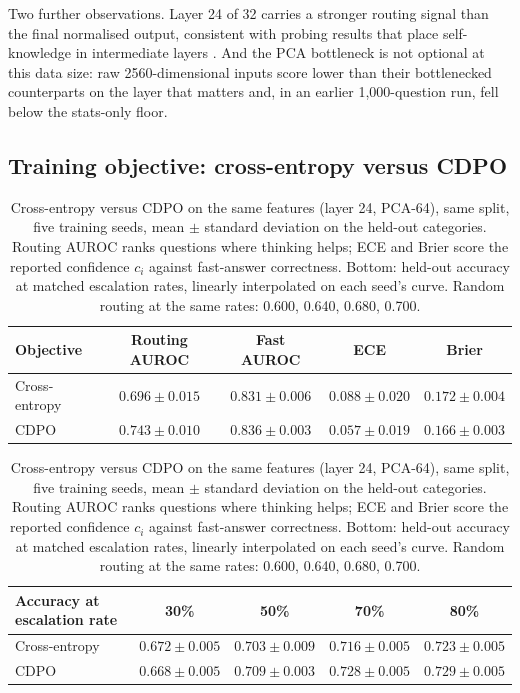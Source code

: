 \documentclass{article}
\newcommand{\cdpo}{CDPO}
\begin{document}
Two further observations. Layer 24 of 32 carries a stronger routing signal than the final normalised output, consistent with probing results that place self-knowledge in intermediate layers \citep{azaria2023internal}. And the PCA bottleneck is not optional at this data size: raw 2560-dimensional inputs score lower than their bottlenecked counterparts on the layer that matters and, in an earlier 1{,}000-question run, fell below the stats-only floor.

\subsection{Training objective: cross-entropy versus \cdpo{}}
\label{sec:objective}

\begin{table}[t]
\caption{Cross-entropy versus \cdpo{} on the same features (layer 24, PCA-64), same split, five training seeds, mean $\pm$ standard deviation on the held-out categories. Routing AUROC ranks questions where thinking helps; ECE and Brier score the reported confidence $c_i$ against fast-answer correctness. Bottom: held-out accuracy at matched escalation rates, linearly interpolated on each seed's curve. Random routing at the same rates: 0.600, 0.640, 0.680, 0.700.}
\label{tab:objective}
\centering
\small
\setlength{\tabcolsep}{4pt}
\begin{tabular}{lcccc}
\toprule
Objective & Routing AUROC & Fast AUROC & ECE & Brier \\
\midrule
Cross-entropy & $0.696\pm0.015$ & $0.831\pm0.006$ & $0.088\pm0.020$ & $0.172\pm0.004$ \\
\cdpo{} & $\mathbf{0.743\pm0.010}$ & $0.836\pm0.003$ & $\mathbf{0.057\pm0.019}$ & $\mathbf{0.166\pm0.003}$ \\
\bottomrule
\end{tabular}
\vspace{4pt}

\begin{tabular}{lcccc}
\toprule
Accuracy at escalation rate & 30\% & 50\% & 70\% & 80\% \\
\midrule
Cross-entropy & $0.672\pm0.005$ & $0.703\pm0.009$ & $0.716\pm0.005$ & $0.723\pm0.005$ \\
\cdpo{} & $0.668\pm0.005$ & $\mathbf{0.709\pm0.003}$ & $\mathbf{0.728\pm0.005}$ & $\mathbf{0.729\pm0.005}$ \\
\bottomrule
\end{tabular}
\end{table}
\end{document}
